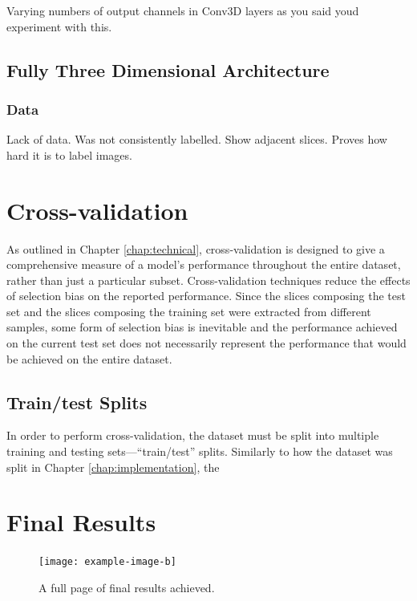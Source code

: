 Varying numbers of output channels in Conv3D layers as you said youd experiment with this.

\subsection{Fully Three Dimensional Architecture}

\subsubsection{Data}

Lack of data. Was not consistently labelled. Show adjacent slices. Proves how hard it is to label images.

\section{Cross-validation}
\label{sec:evalcrossval}

As outlined in Chapter \ref{chap:technical}, cross-validation is designed to give a comprehensive measure of a model's performance throughout the entire dataset, rather than just a particular subset. Cross-validation techniques reduce the effects of selection bias on the reported performance. Since the slices composing the test set and the slices composing the training set were extracted from different samples, some form of selection bias is inevitable and the performance achieved on the current test set does not necessarily represent the performance that would be achieved on the entire dataset.

\subsection{Train/test Splits}

In order to perform cross-validation, the dataset must be split into multiple training and testing sets---``train/test'' splits. Similarly to how the dataset was split in Chapter \ref{chap:implementation}, the

\section{Final Results}

\begin{figure}[!p]
    \centering
    \texttt{[image: example-image-b]}
    \caption{A full page of final results achieved.}
    \label{fig:finalresults}
\end{figure}

